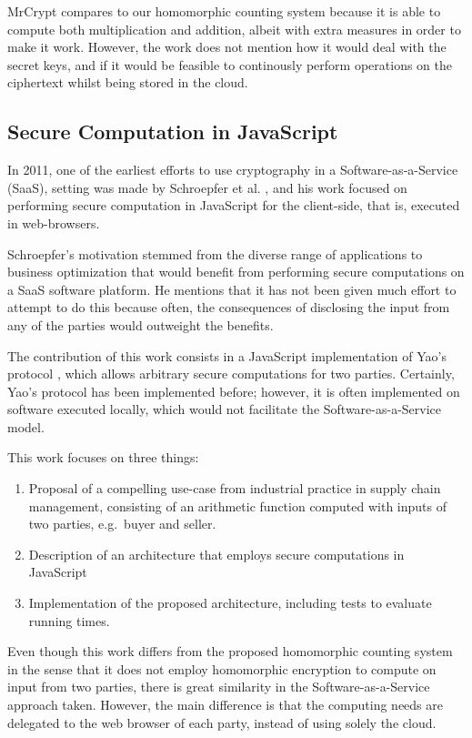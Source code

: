 MrCrypt compares to our homomorphic counting system because it is able to compute both multiplication and addition, albeit with extra measures in order to make it work. However, the work does not mention how it would deal with the secret keys, and if it would be feasible to continously perform operations on the ciphertext whilst being stored in the cloud.

\subsection{Secure Computation in JavaScript}

In 2011, one of the earliest efforts to use cryptography in a Software-as-a-Service (SaaS), setting was made by Schroepfer et al. \cite{Schroepfer:2011:DSC:2046707.2093509}, and his work focused on performing secure computation in JavaScript for the client-side, that is, executed in web-browsers.

Schroepfer's motivation stemmed from the diverse range of applications to business optimization that would benefit from performing secure computations on a SaaS software platform. He mentions that it has not been given much effort to attempt to do this because often, the consequences of disclosing the input from any of the parties would outweight the benefits.

The contribution of this work consists in a JavaScript implementation of Yao's protocol \cite{Yao:1986:GES:1382439.1382944}, which allows arbitrary secure computations for two parties. Certainly, Yao's protocol has been implemented before; however, it is often implemented on software executed locally, which would not facilitate the Software-as-a-Service model.

This work focuses on three things:
\begin{enumerate}
\item Proposal of a compelling use-case from industrial practice in supply chain management, consisting of an arithmetic function computed with inputs of two parties, e.g.\ buyer and seller.
\item Description of an architecture that employs secure computations in JavaScript
\item Implementation of the proposed architecture, including tests to evaluate running times.
\end{enumerate}
   
Even though this work differs from the proposed homomorphic counting system in the sense that it does not employ homomorphic encryption to compute on input from two parties, there is great similarity in the Software-as-a-Service approach taken. However, the main difference is that the computing needs are delegated to the web browser of each party, instead of using solely the cloud.

